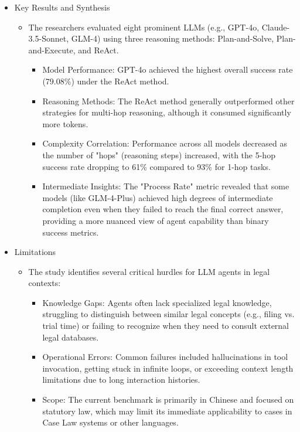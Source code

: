 \begin{itemize}
  \item Key Results and Synthesis
  \begin{itemize}
    \item The researchers evaluated eight prominent LLMs (e.g., GPT-4o, Claude-3.5-Sonnet, GLM-4) using three reasoning methods: Plan-and-Solve, Plan-and-Execute, and ReAct.
    \begin{itemize}
      \item Model Performance: GPT-4o achieved the highest overall success rate (79.08\%) under the ReAct method.
      \item Reasoning Methods: The ReAct method generally outperformed other strategies for multi-hop reasoning, although it consumed significantly more tokens.
      \item Complexity Correlation: Performance across all models decreased as the number of "hops" (reasoning steps) increased, with the 5-hop success rate dropping to 61\% compared to 93\% for 1-hop tasks.
      \item Intermediate Insights: The "Process Rate" metric revealed that some models (like GLM-4-Plus) achieved high degrees of intermediate completion even when they failed to reach the final correct answer, providing a more nuanced view of agent capability than binary success metrics.
    \end{itemize}
  \end{itemize}

  \item Limitations
  \begin{itemize}
    \item The study identifies several critical hurdles for LLM agents in legal contexts:
    \begin{itemize}
      \item Knowledge Gaps: Agents often lack specialized legal knowledge, struggling to distinguish between similar legal concepts (e.g., filing vs. trial time) or failing to recognize when they need to consult external legal databases.
      \item Operational Errors: Common failures included hallucinations in tool invocation, getting stuck in infinite loops, or exceeding context length limitations due to long interaction histories.
      \item Scope: The current benchmark is primarily in Chinese and focused on statutory law, which may limit its immediate applicability to cases in Case Law systems or other languages.
    \end{itemize}
  \end{itemize}
\end{itemize}

